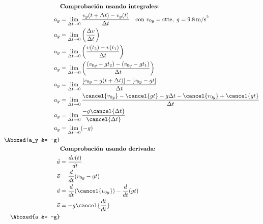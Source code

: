 \begin{align*}
&\textbf{Comprobación usando integrales:} \\
    a_y &= \lim_{\Delta t \to 0} \frac{v_y(t+\Delta t) - v_y(t)}{\Delta t}
    \quad \text{con } v_{0y}=\text{ctte},\; g=9.8\,\text{m/s}^2 \\
    a_y &= \lim_{\Delta t \to 0} \left(\frac{\Delta v}{\Delta t}\right) \\
    a_y &= \lim_{\Delta t \to 0} \left(\frac{v(t_2) - v(t_1)}{\Delta t}\right) \\
    a_y &= \lim_{\Delta t \to 0} \left(\frac{(v_{0y} - gt_2)-(v_{0y} - gt_1)}{\Delta t}\right) \\
    a_y &= \lim_{\Delta t \to 0} \frac{[v_{0y} - g(t+\Delta t)] - [v_{0y} - gt]}{\Delta t} \\
    a_y &= \lim_{\Delta t \to 0} \frac{\cancel{v_{0y}} - \cancel{gt} - g\Delta t - \cancel{v_{0y}} + \cancel{gt}}{\Delta t} \\
    a_y &= \lim_{\Delta t \to 0} \frac{-g\cancel{\Delta t}}{\cancel{\Delta t}} \\
    a_y &= \lim_{\Delta t \to 0} (-g) \\
    \Aboxed{a_y &= -g} \\
&\textbf{Comprobación usando derivada:} \\
    \vec{a} &= \frac{dv(t)}{dt} \\
    \vec{a} &= \frac{d}{dt}(v_{0y}-gt) \\
    \vec{a} &= \frac{d}{dt}(\cancel{v_{0y}}) - \frac{d}{dt}(gt)\\
    \vec{a} &= -g \cancel{\frac{dt}{dt}}\\
    \Aboxed{a &= -g}
\end{align*}
